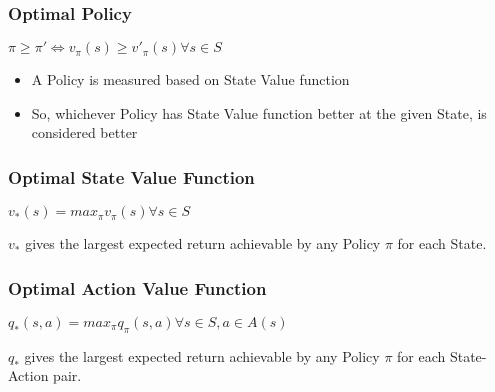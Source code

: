 

\begin{frame}[fragile]\frametitle{Optimal Policy}

$\pi \geq \pi' \iff v_{\pi}(s) \geq {v'}_{\pi}(s) \forall s \in S$

\begin{itemize}
\item A Policy is measured based on State Value function
\item So, whichever Policy has State Value function better at the given State, is considered better
\end{itemize}

\end{frame}

\begin{frame}[fragile]\frametitle{Optimal State Value Function}

$v_{*}(s) = max_{\pi} v_{\pi}(s) \forall s \in S$

$v_{*}$ gives the largest expected return achievable by any Policy $\pi$ for each State.

\end{frame}

\begin{frame}[fragile]\frametitle{Optimal Action Value Function}

$q_{*}(s,a) = max_{\pi} q_{\pi}(s,a) \forall s \in S, a \in A(s)$

$q_{*}$ gives the largest expected return achievable by any Policy $\pi$ for each State-Action pair.

\end{frame}

